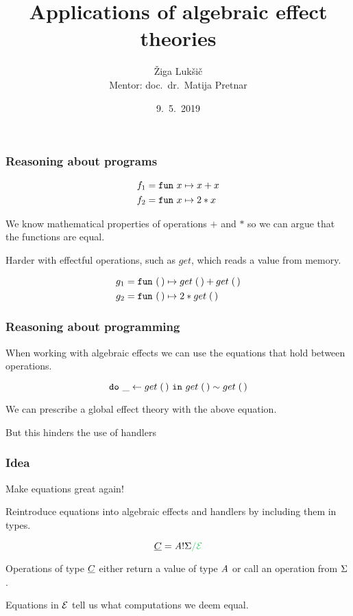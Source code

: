 \documentclass[usenames,dvipsnames]{beamer}
\title[Applications of algebraic effect theories]{\LARGE Applications of algebraic effect theories}
\author[Žiga Lukšič]{Žiga Lukšič \\ Mentor: doc.\ dr.\ Matija Pretnar}
\date{9.\ 5.\ 2019}
\begin{document}
\begin{frame}
  \titlepage
\end{frame}
\begin{frame}
	\frametitle{Reasoning about programs}
	
  \begin{align*}
		f_1 =& \;\mathtt{fun}~{x} \mapsto{x + x}\\
		f_2 =& \;\mathtt{fun}~{x} \mapsto{2*x}
	\end{align*}

	We know mathematical properties of operations $+$ and $*$ so we can argue that the functions are equal.
	
	\vspace{5mm}

	Harder with effectful operations, such as $get$, which reads a value from memory.

	\begin{align*}
		g_1 =& \;\mathtt{fun}~{\mathtt{(\,)}} \mapsto{{get}\;{\mathtt{(\,)}} + {get}\;{\mathtt{(\,)}}}\\
		g_2 =& \;\mathtt{fun}~{\mathtt{(\,)}} \mapsto{2*{get}\;{\mathtt{(\,)}}}
	\end{align*}


\end{frame}
\begin{frame}
	\frametitle{Reasoning about programming}
	
	When working with algebraic effects we can use the equations that hold between operations.

	\vspace{5mm}

	\[\mathtt{do}~{\_} \leftarrow{{get}\;{\mathtt{(\,)}}}~\mathtt{in}~{{get}\;{\mathtt{(\,)}}} \sim {get}\;{\mathtt{(\,)}}\]

	We can prescribe a global effect theory with the above equation.

	\vspace{5mm}

	But this hinders the use of handlers 



\end{frame}
\begin{frame}
	\frametitle{Idea}
	Make equations great again!
	\vspace{5mm}

	Reintroduce equations into algebraic effects and handlers by including them in types.

  \[
    \ctyC = \tyA \bang \sig \new{\witheq \eqE}
  \]

  Operations of type $\underline{C}$ either return a value of type $\mathit{A}$ or call an operation from $\Sigma$ .
  \vspace{5mm}

  Equations in $\mathcal{E}$ tell us what computations we deem equal.
\end{frame}
\end{document}
